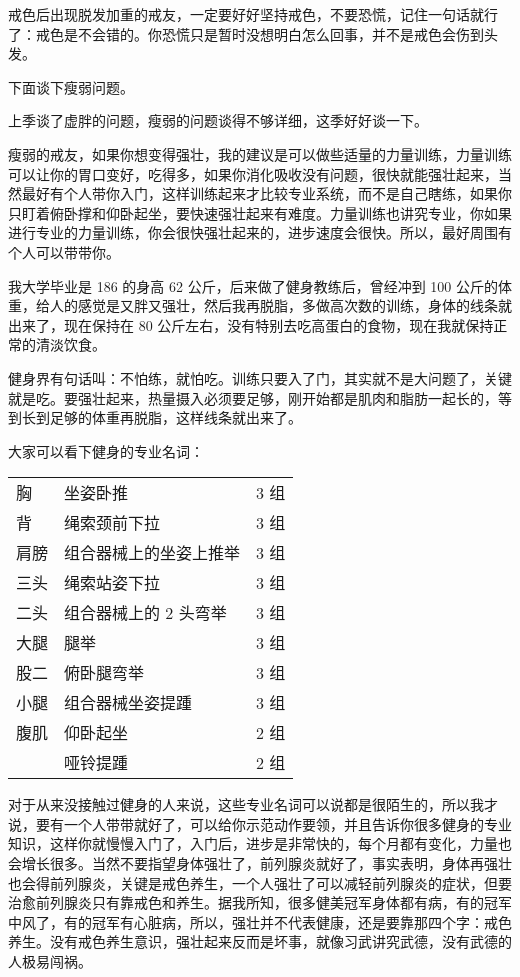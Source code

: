 \documentclass{ctexart}
\begin{document}
戒色后出现脱发加重的戒友，一定要好好坚持戒色，不要恐慌，记住一句话就行了：戒色是不会错的。你恐慌只是暂时没想明白怎么回事，并不是戒色会伤到头发。

下面谈下瘦弱问题。

上季谈了虚胖的问题，瘦弱的问题谈得不够详细，这季好好谈一下。

瘦弱的戒友，如果你想变得强壮，我的建议是可以做些适量的力量训练，力量训练可以让你的胃口变好，吃得多，如果你消化吸收没有问题，很快就能强壮起来，当然最好有个人带你入门，这样训练起来才比较专业系统，而不是自己瞎练，如果你只盯着俯卧撑和仰卧起坐，要快速强壮起来有难度。力量训练也讲究专业，你如果进行专业的力量训练，你会很快强壮起来的，进步速度会很快。所以，最好周围有个人可以带带你。

我大学毕业是 186 的身高 62 公斤，后来做了健身教练后，曾经冲到 100 公斤的体重，给人的感觉是又胖又强壮，然后我再脱脂，多做高次数的训练，身体的线条就出来了，现在保持在 80 公斤左右，没有特别去吃高蛋白的食物，现在我就保持正常的清淡饮食。

健身界有句话叫：不怕练，就怕吃。训练只要入了门，其实就不是大问题了，关键就是吃。要强壮起来，热量摄入必须要足够，刚开始都是肌肉和脂肪一起长的，等到长到足够的体重再脱脂，这样线条就出来了。

大家可以看下健身的专业名词：

\begin{table}[ht]
    \centering
    \begin{tabular}{l l l}
        胸  & 坐姿卧推         & 3 组 \\
        背  & 绳索颈前下拉       & 3 组 \\
        肩膀 & 组合器械上的坐姿上推举  & 3 组 \\
        三头 & 绳索站姿下拉       & 3 组 \\
        二头 & 组合器械上的 2 头弯举 & 3 组 \\
        大腿 & 腿举           & 3 组 \\
        股二 & 俯卧腿弯举        & 3 组 \\
        小腿 & 组合器械坐姿提踵     & 3 组 \\
        腹肌 & 仰卧起坐         & 2 组 \\
           & 哑铃提踵         & 2 组
    \end{tabular}
\end{table}

对于从来没接触过健身的人来说，这些专业名词可以说都是很陌生的，所以我才说，要有一个人带带就好了，可以给你示范动作要领，并且告诉你很多健身的专业知识，这样你就慢慢入门了，入门后，进步是非常快的，每个月都有变化，力量也会增长很多。当然不要指望身体强壮了，前列腺炎就好了，事实表明，身体再强壮也会得前列腺炎，关键是戒色养生，一个人强壮了可以减轻前列腺炎的症状，但要治愈前列腺炎只有靠戒色和养生。据我所知，很多健美冠军身体都有病，有的冠军中风了，有的冠军有心脏病，所以，强壮并不代表健康，还是要靠那四个字：戒色养生。没有戒色养生意识，强壮起来反而是坏事，就像习武讲究武德，没有武德的人极易闯祸。
\end{document}
